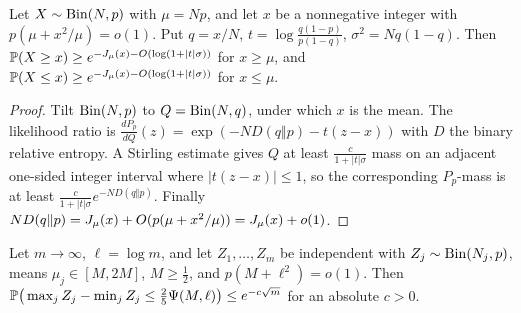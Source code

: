 \begin{lemma}\label{lem:reverse-cramer}
Let $X\sim\mathrm{Bin}(N,p)$ with $\mu=Np$, and let $x$ be a nonnegative integer with $p(\mu+x^2/\mu)=o(1)$. Put $q=x/N$,
$t=\log\frac{q(1-p)}{p(1-q)}$, $\sigma^2=Nq(1-q)$. Then $\mathbb{P}(X\ge x)\ge e^{-J_\mu(x)-O(\log(1+|t|\sigma))}$ for $x\ge\mu$,
and $\mathbb{P}(X\le x)\ge e^{-J_\mu(x)-O(\log(1+|t|\sigma))}$ for $x\le\mu$.
\end{lemma}

\begin{proof}
Tilt $\mathrm{Bin}(N,p)$ to $Q=\mathrm{Bin}(N,q)$, under which $x$ is the mean. The likelihood ratio is
$\frac{dP_p}{dQ}(z)=\exp(-N D(q\Vert p)-t(z-x))$ with $D$ the binary relative entropy. A Stirling estimate gives $Q$ at least
$\tfrac{c}{1+|t|\sigma}$ mass on an adjacent one-sided integer interval where $|t(z-x)|\le1$, so the corresponding $P_p$-mass
is at least $\tfrac{c}{1+|t|\sigma}e^{-ND(q\Vert p)}$. Finally $ND(q\Vert p)=J_\mu(x)+O(p(\mu+x^2/\mu))=J_\mu(x)+o(1)$.
\end{proof}

\begin{lemma}\label{lem:comparable}
Let $m\to\infty$, $\ell=\log m$, and let $Z_1,\dots,Z_m$ be independent with $Z_j\sim\mathrm{Bin}(N_j,p)$, means $\mu_j\in[M,2M]$,
$M\ge\tfrac12$, and $p(M+\ell^2)=o(1)$. Then $\mathbb{P}\big(\max_j Z_j-\min_j Z_j\le\tfrac25\Psi(M,\ell)\big)\le e^{-c\sqrt m}$ for
an absolute $c>0$.
\end{lemma}

